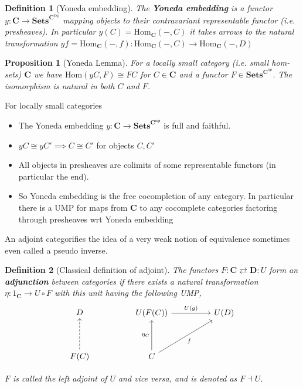 \documentclass[12pt]{article}
\numberwithin{equation}{section}
\newtheorem{definition}{Definition}[section]
\newtheorem{proposition}{Proposition}[section]
\begin{document}
		\begin{definition}[Yoneda embedding]
			The \textbf{Yoneda embedding} is a functor $y:\mathbf{C}\to \mathbf{Sets}^{\mathbf{C}^\text{Op}}$ mapping objects to their contravariant representable functor (i.e. presheaves). In particular $y(C)=\textrm{Hom}_\mathbf{C}(-,C)$ it takes arrows to the natural transformation $yf=\mathrm{Hom}_\mathbf{C}(-,f):\mathrm{Hom}_\mathbf{C}(-,C) \to \mathrm{Hom}_\mathbf{C}(-,D)$
			
		\end{definition}
		
	\begin{proposition}[Yoneda Lemma]
			For a locally small category (i.e. small hom-sets) $\mathbf{C}$ we have $\textrm{Hom}(yC,F) \cong FC$ for $C \in \mathbf{C}$ and a functor $F \in \mathbf{Sets}^{\mathbf{C}^{op}}$. The isomorphism is natural in both $C$ and $F$.
	\end{proposition}
	
	For locally small categories
	\begin{itemize}
		\item The Yoneda embedding $y: \mathbf{C} \to \mathbf{Sets}^{\mathbf{C}^\mathbf{op}}$ is full and faithful.
		\item $yC \cong yC' \implies C \cong C'$ for objects $C,C'$
		\item All objects in presheaves are colimits of some representable functors (in particular the end). 
		\item So Yoneda embedding is the free cocompletion of any category. In particular there is a UMP for maps from $\mathbf{C}$ to any cocomplete categories factoring through presheaves wrt Yoneda embedding
	\end{itemize}	
	An adjoint categorifies the idea of a very weak notion of equivalence sometimes even called a pseudo inverse.
	\begin{definition}[Classical definition of adjoint]
	The functors $F: \mathbf{C} \rightleftarrows \mathbf{D}: U$ form an \textbf{adjunction} between categories if there exists a natural transformation $\eta: 1_\mathbf{C} \to U \circ F$ with this unit having the following UMP,
	\[\begin{tikzcd}
		D && {U(F(C))} && {U(D)} \\
		\\
		{F(C)} && C
		\arrow["f"', from=3-3, to=1-5]
		\arrow["{\eta_C}", from=3-3, to=1-3]
		\arrow["{U(g)}", from=1-3, to=1-5]
		\arrow[dashed, from=3-1, to=1-1]
	\end{tikzcd}\]
	
	$F$ is called the left adjoint of $U$ and vice versa, and is denoted as $F \dashv U$.
	\end{definition}
	
\end{document}
